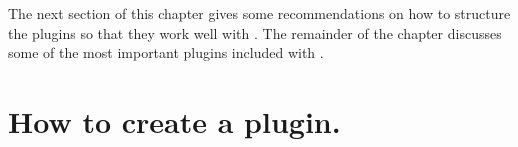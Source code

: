 The next section of this chapter gives some recommendations on how to structure the plugins so that they work well with \pyformex. The remainder of the chapter discusses some of the most important plugins included with \pyformex. 

\section{How to create a \pyformex plugin.}
\label{sec:plugins-create}



